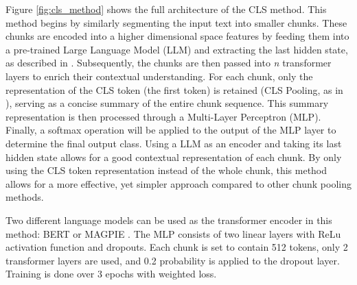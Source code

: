 Figure \ref{fig:cls_method} shows the full architecture of the CLS method.
This method begins by similarly segmenting the input text into smaller chunks. These chunks are encoded into a higher dimensional space features by feeding them into a pre-trained Large Language Model (LLM) and extracting the last hidden state, as described in \cite{sun-2020-fine-tune}. Subsequently, the chunks are then passed into \textit{n} transformer layers to enrich their contextual understanding. For each chunk, only the representation of the CLS token (the first token) is retained (CLS Pooling, as in \cite{su-2021-classifying}), serving as a concise summary of the entire chunk sequence. This summary representation is then processed through a Multi-Layer Perceptron (MLP). Finally, a softmax operation will be applied to the output of the MLP layer to determine the final output class. Using a LLM as an encoder and taking its last hidden state allows for a good contextual representation of each chunk. By only using the CLS token representation instead of the whole chunk, this method allows for a more effective, yet simpler approach compared to other chunk pooling methods.

Two different language models can be used as the transformer encoder in this method: BERT \cite{devlin-2019-bert} or MAGPIE \cite{horych-2024-magpie}. The MLP consists of two linear layers with ReLu activation function \cite{agarap-2018-relu} and dropouts. Each chunk is set to contain 512 tokens, only 2 transformer layers are used, and 0.2 probability is applied to the dropout layer. Training is done over 3 epochs with weighted loss.

\begin{comment}
The complexity of the CLS method can be expressed as:
\[
    O(L \cdot TF \cdot T \cdot H_{\text{enc}}^2 \cdot M \cdot H_{\text{mlp}}^2)
\]

where:
\begin{align*}
    L              & : \text{Sequence length (number of tokens)}, \\
    T              & : \text{Number of transformer layers},       \\
    H_{\text{enc}} & : \text{Hidden size of transformer layers},  \\
    M              & : \text{Number of layers in the MLP},        \\
    H_{\text{mlp}} & : \text{Hidden size of the MLP}.             \\
\end{align*}
\end{comment}

